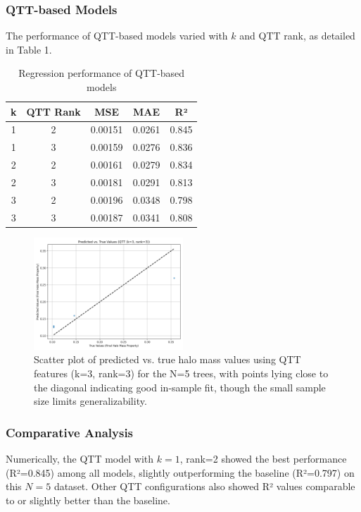 \documentclass[twocolumn]{aastex631}
\begin{document}
\subsubsection{QTT-based Models}
The performance of QTT-based models varied with $k$ and QTT rank, as detailed in Table 1.

\begin{table}[h!]
    \centering
    \caption{Regression performance of QTT-based models}
    \begin{tabular}{c c c c c}
        \hline
        k & QTT Rank & MSE & MAE & R² \\
        \hline
        1 & 2 & 0.00151 & 0.0261 & 0.845 \\
        1 & 3 & 0.00159 & 0.0276 & 0.836 \\
        2 & 2 & 0.00161 & 0.0279 & 0.834 \\
        2 & 3 & 0.00181 & 0.0291 & 0.813 \\
        3 & 2 & 0.00196 & 0.0348 & 0.798 \\
        3 & 3 & 0.00187 & 0.0341 & 0.808 \\
        \hline
    \end{tabular}
\end{table}

\begin{figure}[h!]
    \centering
    \includegraphics[width=0.5\textwidth]{../input_files/plots/pred_vs_true_qtt_k3_r3_19_20250524-175150.png}
    \caption{Scatter plot of predicted vs. true halo mass values using QTT features (k=3, rank=3) for the N=5 trees, with points lying close to the diagonal indicating good in-sample fit, though the small sample size limits generalizability.
}
    \label{fig:pred_vs_true_qtt}
\end{figure}

\subsubsection{Comparative Analysis}
Numerically, the QTT model with $k=1$, rank=2 showed the best performance (R²=0.845) among all models, slightly outperforming the baseline (R²=0.797) on this $N=5$ dataset. Other QTT configurations also showed R² values comparable to or slightly better than the baseline.
\end{document}
